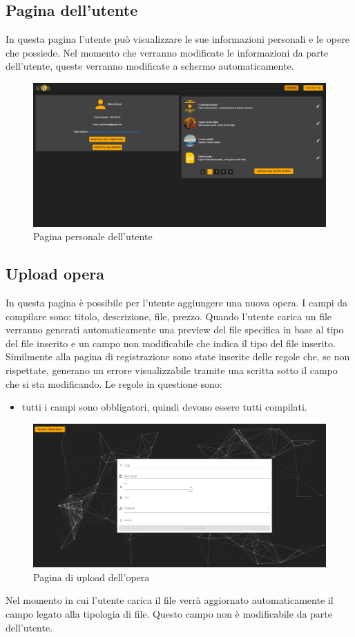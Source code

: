 \subsection{Pagina dell'utente}
In questa pagina l'utente può visualizzare le sue informazioni personali e le opere che possiede. Nel momento che verranno modificate le informazioni da parte dell'utente, queste verranno modificate a schermo automaticamente.
\begin{figure}[H]
	\begin{center}
		\includegraphics[width=0.7\columnwidth]{immagini/userPage.png}
		\caption{Pagina personale dell'utente}
	\end{center}
\end{figure}
\subsection{Upload opera}
In questa pagina è possibile per l'utente aggiungere una nuova opera. I campi da compilare sono: titolo, descrizione, file, prezzo. Quando l'utente carica un file verranno generati automaticamente una preview del file specifica in base al tipo del file inserito e un campo non modificabile che indica il tipo del file inserito. Similmente alla pagina di registrazione sono state inserite delle regole che, se non rispettate, generano un errore visualizzabile tramite una scritta sotto il campo che si sta modificando. Le regole in questione sono:
\begin{itemize}
	\item tutti i campi sono obbligatori, quindi devono essere tutti compilati.
\end{itemize}
\begin{figure}[H]
	\begin{center}
		\includegraphics[width=0.7\columnwidth]{immagini/uploadOpera.png}
		\caption{Pagina di upload dell'opera}
	\end{center}
\end{figure}
Nel momento in cui l'utente carica il file verrà aggiornato automaticamente il campo legato alla tipologia di file. Questo campo non è modificabile da parte dell'utente.
